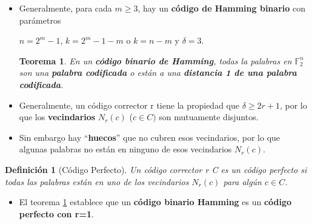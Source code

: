 \documentclass{beamer}
\theoremstyle{plain}
\newtheorem{teorema} [Teorema] {Teorema}
\newtheorem{definicion} [Definicion]{Definición}
\theoremstyle{example}
\theoremstyle{example}
\begin{document}
\begin{frame}  \footnotesize  


\begin{itemize}

 \item Generalmente, para cada $m\geq 3$, hay un \textbf{código de Hamming binario} con parámetros
\begin{center}
 $n=2^m-1$, $k=2^m-1-m$ o $k=n-m$ y $\delta=3$.
\end{center}

\begin{teorema}\label{teo:CBH}
En un \textbf{código binario de Hamming}, todas la palabras en $\mathbb{F}_2^n$ son una \textbf{palabra codificada} o están a una \textbf{distancia 1 de una palabra codificada}.
\end{teorema}

\item  Generalmente, un código corrector r tiene la propiedad que $\delta\geq 2r+1$, por lo que los \textbf{vecindarios} $N_r(c)$ ($c \in C)$ son mutuamente disjuntos.

\item Sin embargo hay  ``\textbf{huecos}'' que no cubren esos vecindarios, por lo que algunas palabras no están en ninguno de esos vecindarios $N_r(c)$.

\end{itemize} 

\begin{definicion}[Código Perfecto]

Un código corrector r C es un código perfecto si todas las palabras están en uno de los vecindarios $N_r(c)$ para algún $c \in C$.
\end{definicion}


\begin{itemize} 

\item El teorema \ref{teo:CBH} establece que un \textbf{código binario Hamming} es un \textbf{código perfecto con r=1}. 


\end{itemize} \end{frame} 
\end{document}
